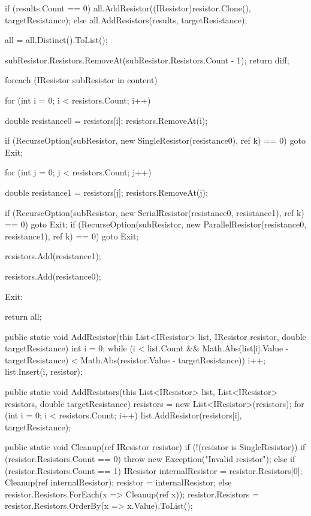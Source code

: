 \documentclass{article}
\begin{document}
\begin{Csharp}[caption=Klasse ResistorBuilder,label=LIS:Buildr]
{{{{{                    if (results.Count == 0) all.AddResistor((IResistor)resistor.Clone(), targetResistance);
                    else all.AddResistors(results, targetResistance);

                    all = all.Distinct().ToList();
                }
            }
            subResistor.Resistors.RemoveAt(subResistor.Resistors.Count - 1);
            return diff;
        }

        foreach (IResistor subResistor in content)
        {
            for (int i = 0; i < resistors.Count; i++)
            {
                double resistance0 = resistors[i];
                resistors.RemoveAt(i);

                if (RecurseOption(subResistor, new SingleResistor(resistance0), ref k) == 0) goto Exit;

                for (int j = 0; j < resistors.Count; j++)
                {
                    double resistance1 = resistors[j];
                    resistors.RemoveAt(j);

                    if (RecurseOption(subResistor, new SerialResistor(resistance0, resistance1), ref k) == 0) goto Exit;
                    if (RecurseOption(subResistor, new ParallelResistor(resistance0, resistance1), ref k) == 0) goto Exit;

                    resistors.Add(resistance1);
                }

                resistors.Add(resistance0);
            }
        }

        Exit:

        return all;
    }

    public static void AddResistor(this List<IResistor> list, IResistor resistor, double targetResistance)
    {
        int i = 0;
        while (i < list.Count && Math.Abs(list[i].Value - targetResistance) < Math.Abs(resistor.Value - targetResistance)) i++;
        list.Insert(i, resistor);
    }

    public static void AddResistors(this List<IResistor> list, List<IResistor> resistors, double targetResistance)
    {
        resistors = new List<IResistor>(resistors);
        for (int i = 0; i < resistors.Count; i++)
        {
            list.AddResistor(resistors[i], targetResistance);
        }
    }

    public static void Cleanup(ref IResistor resistor)
    {
        if (!(resistor is SingleResistor))
        {
            if (resistor.Resistors.Count == 0)
            {
                throw new Exception("Invalid resistor");
            }
            else if (resistor.Resistors.Count == 1)
            {
                IResistor internalResistor = resistor.Resistors[0];
                Cleanup(ref internalResistor);
                resistor = internalResistor;
            }
            else
            {
                resistor.Resistors.ForEach(x => Cleanup(ref x));
                resistor.Resistors = resistor.Resistors.OrderBy(x => x.Value).ToList();
            }
        }
    }
}
\end{Csharp}
\end{document}
